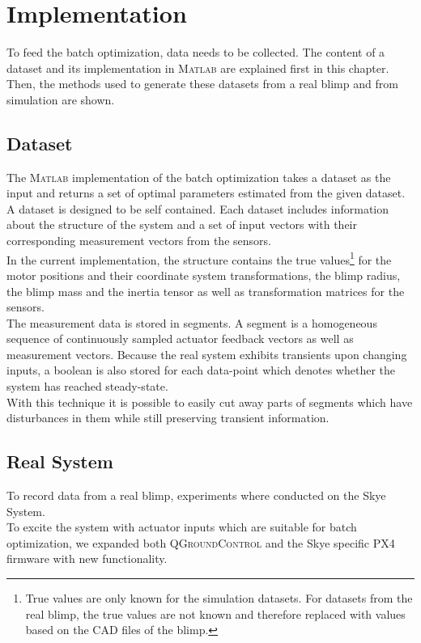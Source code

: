\chapter{Implementation}
\label{chap:implementation}

To feed the batch optimization, data needs to be collected.
The content of a dataset and its implementation in \textsc{Matlab} are explained first in this chapter.
Then, the methods used to generate these datasets from a real blimp and from simulation are shown.

\section{Dataset}
\label{sec:dataset}
The \textsc{Matlab} implementation of the batch optimization takes a dataset as the input and returns a set of optimal parameters estimated from the given dataset. \\
A dataset is designed to be self contained. 
Each dataset includes information about the structure of the system and a set of input vectors with their corresponding measurement vectors from the sensors. \\
In the current implementation, the structure contains the true values\footnote{
True values are only known for the simulation datasets. 
For datasets from the real blimp, the true values are not known and therefore replaced with values based on the CAD files of the blimp.}
for the motor positions and their coordinate system transformations, the blimp radius, the blimp mass and the inertia tensor as well as transformation matrices for the sensors. \\
The measurement data is stored in segments.
A segment is a homogeneous sequence of continuously sampled actuator feedback vectors as well as measurement vectors.
Because the real system exhibits transients upon changing inputs, a boolean is also stored for each data-point which denotes whether the system has reached steady-state. \\
With this technique it is possible to easily cut away parts of segments which have disturbances in them while still preserving transient information.

\section{Real System}
\label{sec:real_system}
To record data from a real blimp, experiments where conducted on the Skye System. \\
To excite the system with actuator inputs which are suitable for batch optimization, we expanded both \textsc{QGroundControl} and the Skye specific PX4 firmware with new functionality.

